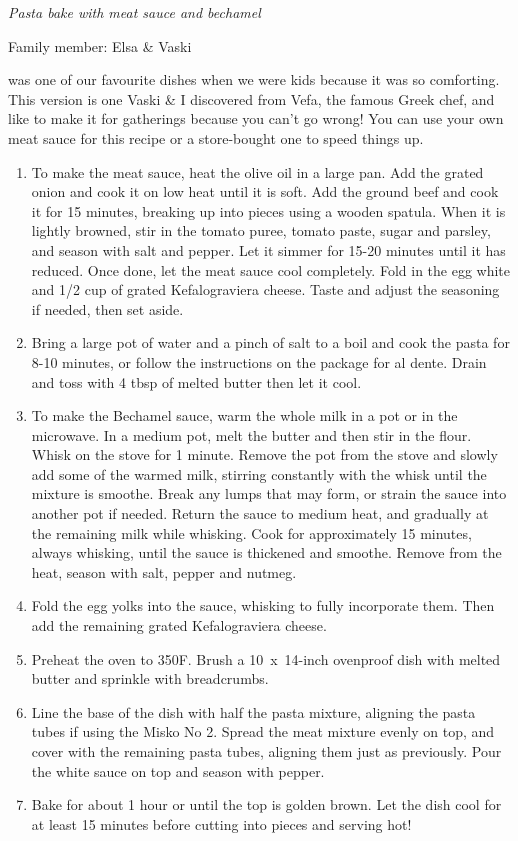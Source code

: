 \textit{Pasta bake with meat sauce and bechamel}

Family member: Elsa \& Vaski

 was one of our favourite dishes when we were kids because it was so comforting. This version is one Vaski \& I discovered from Vefa, the famous Greek chef, and like to make it for gatherings because you can't go wrong! You can use your own meat sauce for this recipe or a store-bought one to speed things up.

\begin{enumerate}
    \item To make the meat sauce, heat the olive oil in a large pan. Add the grated onion and cook it on low heat until it is soft. Add the ground beef and cook it for 15 minutes, breaking up into pieces using a wooden spatula. When it is lightly browned, stir in the tomato puree, tomato paste, sugar and parsley, and season with salt and pepper. Let it simmer for 15-20 minutes until it has reduced. Once done, let the meat sauce cool completely. Fold in the egg white and 1/2 cup of grated Kefalograviera cheese. Taste and adjust the seasoning if needed, then set aside.
    \item Bring a large pot of water and a pinch of salt to a boil and cook the pasta for 8-10 minutes, or follow the instructions on the package for al dente. Drain and toss with 4 tbsp of melted butter then let it cool.
    \item To make the Bechamel sauce, warm the whole milk in a pot or in the microwave. In a medium pot, melt the butter and then stir in the flour. Whisk on the stove for 1 minute. Remove the pot from the stove and slowly add some of the warmed milk, stirring constantly with the whisk until the mixture is smoothe. Break any lumps that may form, or strain the sauce into another pot if needed. Return the sauce to medium heat, and gradually at the remaining milk while whisking. Cook for approximately 15 minutes, always whisking, until the sauce is thickened and smoothe. Remove from the heat, season with salt, pepper and nutmeg.
    \item Fold the egg yolks into the sauce, whisking to fully incorporate them. Then add the remaining grated Kefalograviera cheese.
    \item Preheat the oven to 350\degree F. Brush a 10~x~14-inch ovenproof dish with melted butter and sprinkle with breadcrumbs.
    \item Line the base of the dish with half the pasta mixture, aligning the pasta tubes if using the Misko No 2. Spread the meat mixture evenly on top, and cover with the remaining pasta tubes, aligning them just as previously. Pour the white sauce on top and season with pepper.
    \item Bake for about 1 hour or until the top is golden brown. Let the dish cool for at least 15 minutes before cutting into pieces and serving hot!
\end{enumerate}
